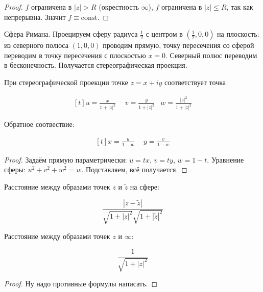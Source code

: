 \begin{proof}
    $f$ ограничена в $|z| > R$ (окрестность $\infty$),
    $f$ ограничена в $|z| \le R$, так как непрерывна.
    Значит $f \equiv \mathrm{const}$.
\end{proof}

\begin{definition}
    Сфера Римана.
    Проецируем сферу радиуса $\frac12$ с центром в $(\frac12, 0, 0)$
    на плоскость: из северного полюса $(1, 0, 0)$
    проводим прямую, точку пересечения со сферой переводим
    в точку пересечения с плоскостью $x = 0$. Северный полюс
    переводим в бесконечность.
    Получается стереографическая проекция.
\end{definition}

\begin{theorem}
    При стереографической проекции точке $z = x + iy$
    соответствует точка

    \[
        \begin{aligned}[t]
            u = \frac{x}{1+|z|^2} & \ \ %
            v = \frac{y}{1+|z|^2} &
            w = \frac{|z|^2}{1+|z|^2}
        \end{aligned}
    \]

    Обратное соотвествие:

    \[
        \begin{aligned}[t]
            x = \frac{u}{1-w} & \ \ %
            y = \frac{v}{1-w}
        \end{aligned}
    \]
\end{theorem}

\begin{proof}
    Задаём прямую параметрически: $u = tx$, $v = ty$, $w = 1 - t$.
    Уравнение сферы: $u^2+v^2+w^2 = w$.
    Подставляем, всё получается.
\end{proof}

\begin{consequence}
    Расстояние между образами точек $z$ и $\widetilde z$
    на сфере:

    \[
        \frac{|z-\widetilde z|}{\sqrt{1+|z|^2}\sqrt{1+|\widetilde z|^2}}
    \]

    Расстояние между образами точек $z$ и $\infty$:

    \[
        \frac{1}{\sqrt{1+|z|^2}}
    \]
\end{consequence}

\begin{proof}
    Ну надо противные формулы написать.
\end{proof}

